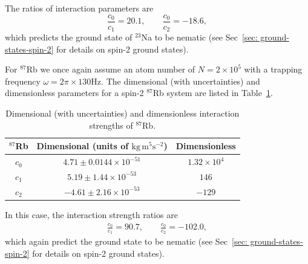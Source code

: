 The ratios of interaction parameters are
\begin{equation}
    \frac{c_0}{c_1} = 20.1, \qquad \frac{c_0}{c_2} = -18.6,
\end{equation}
which predicts the ground state of \( ^{23}\)Na to be nematic (see
Sec~\ref{sec: ground-states-spin-2} for details on spin-2 ground states).

For \( ^{87}\)Rb we once again assume an atom number of \(N=2\times10^5\) with a
trapping frequency \(\omega = 2\pi \times 130\)Hz.
The dimensional (with uncertainties) and dimensionless parameters for a spin-2
\( ^{87}\)Rb system are listed in
Table~\ref{table: spin-2-interactions-rb87}.
\begin{table}
    \centering
    \begin{tabular}{ccc}
        \toprule
        \( ^{87}\)Rb & Dimensional (units of \(\text{kg}\, \text{m}^5
        \text{s}^{-2} \)) & Dimensionless \\
        \midrule
        \(c_0\) & \(4.71 \pm 0.0144 \times 10^{-51}\) & \(1.32\times10^4\) \\
        \(c_1\) & \(5.19 \pm 1.44 \times 10^{-53}\) & \(146\) \\
        \(c_2\) & \(-4.61 \pm 2.16 \times 10^{-53}\) & \(-129\) \\
        \bottomrule
    \end{tabular}
    \caption{\label{table: spin-2-interactions-rb87}Dimensional (with
    uncertainties) and dimensionless interaction strengths of \( ^{87}\)Rb.}
\end{table}
In this case, the interaction strength ratios are
\begin{align}
    \frac{c_0}{c_1} = 90.7, \qquad \frac{c_0}{c_2} = -102.0,
\end{align}
which again predict the ground state to be nematic (see
Sec~\ref{sec: ground-states-spin-2} for details on spin-2 ground states).
